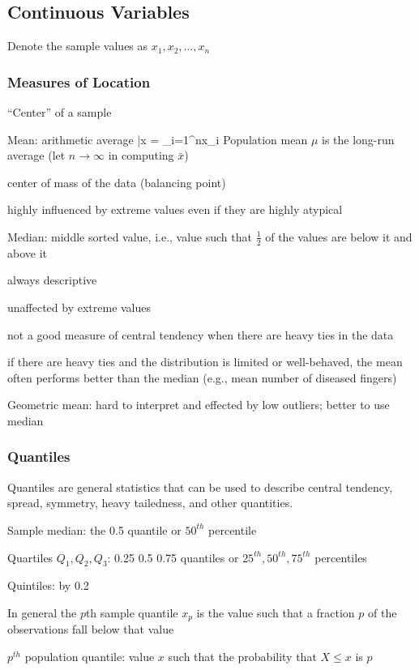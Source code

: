\subsection{Continuous Variables} 
Denote the sample values as $x_{1}, x_{2}, \ldots, x_{n}$
\subsubsection{Measures of Location}
``Center'' of a sample
\bi
\item Mean: arithmetic average
\beq
\bar{x} = \sum_{i=1}^{n}x_{i}
\eeq
Population mean $\mu$ is the long-run average (let $n \rightarrow
\infty$ in computing $\bar{x}$) \\
 \bi
 \item center of mass of the data (balancing point)
 \item highly influenced by extreme values even if they are highly
   atypical
 \ei
\item Median: middle sorted value, i.e., value such that $\frac{1}{2}$
  of the values are below it and above it
 \bi
 \item always descriptive
 \item unaffected by extreme values
 \item not a good measure of central tendency when there are heavy
   ties in the data
 \item if there are heavy ties and the distribution is limited or
   well-behaved, the mean often performs better than the median (e.g.,
   mean number of diseased fingers)
 \ei
\item Geometric mean: hard to interpret and effected by low outliers;
  better to use median
\ei

\subsubsection{Quantiles}
Quantiles are general statistics that can be used to describe central
tendency, spread, symmetry, heavy tailedness, and other quantities.
\bi
\item Sample median: the 0.5 quantile or $50^{th}$ percentile
\item Quartiles $Q_{1}, Q_{2}, Q_{3}$: 0.25 0.5 0.75 quantiles or
  $25^{th}, 50^{th}, 75^{th}$ percentiles
\item Quintiles: by 0.2
\item In general the $p$th sample quantile $x_{p}$ is the value such that a
  fraction $p$ of the observations fall below that value \\
\item $p^{th}$ population quantile: value $x$ such that the
  probability that $X \leq x$ is $p$
\ei

